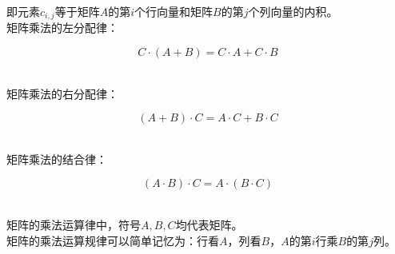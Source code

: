 \documentclass[UTF8]{ctexart}
\begin{document}
    即元素$c_{i,j}$等于矩阵$A$的第$i$个行向量和矩阵$B$的第$j$个列向量的内积。\\[12mm]
    矩阵乘法的左分配律：
    \begin{large}
        \begin{equation*}
            C\cdot (A+B)=C\cdot A+C\cdot B
        \end{equation*}
    \end{large}\\
    矩阵乘法的右分配律：
    \begin{large}
        \begin{equation*}
            (A+B)\cdot C=A\cdot C+B\cdot C
        \end{equation*}
    \end{large}\\
    矩阵乘法的结合律：
    \begin{large}
        \begin{equation*}
            (A\cdot B)\cdot C=A\cdot(B\cdot C)
        \end{equation*}
    \end{large}\\
    矩阵的乘法运算律中，符号$A,B,C$均代表矩阵。\\[3mm]
    矩阵的乘法运算规律可以简单记忆为：行看$A$，列看$B$，$A$的第$i$行乘$B$的第$j$列。

\newpage
\end{document}
